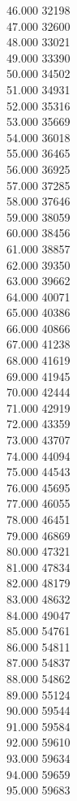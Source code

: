 { 46.000	32198 \\
 47.000	32600 \\
 48.000	33021 \\
 49.000	33390 \\
 50.000	34502 \\
 51.000	34931 \\
 52.000	35316 \\
 53.000	35669 \\
 54.000	36018 \\
 55.000	36465 \\
 56.000	36925 \\
 57.000	37285 \\
 58.000	37646 \\
 59.000	38059 \\
 60.000	38456 \\
 61.000	38857 \\
 62.000	39350 \\
 63.000	39662 \\
 64.000	40071 \\
 65.000	40386 \\
 66.000	40866 \\
 67.000	41238 \\
 68.000	41619 \\
 69.000	41945 \\
 70.000	42444 \\
 71.000	42919 \\
 72.000	43359 \\
 73.000	43707 \\
 74.000	44094 \\
 75.000	44543 \\
 76.000	45695 \\
 77.000	46055 \\
 78.000	46451 \\
 79.000	46869 \\
 80.000	47321 \\
 81.000	47834 \\
 82.000	48179 \\
 83.000	48632 \\
 84.000	49047 \\
 85.000	54761 \\
 86.000	54811 \\
 87.000	54837 \\
 88.000	54862 \\
 89.000	55124 \\
 90.000	59544 \\
 91.000	59584 \\
 92.000	59610 \\
 93.000	59634 \\
 94.000	59659 \\
 95.000	59683 \\
}
